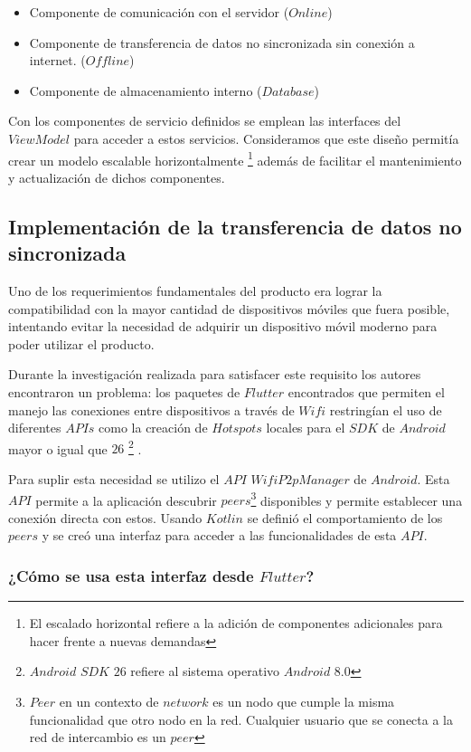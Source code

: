 \begin{itemize}
\item Componente de comunicación con el servidor ($Online$)
\item Componente de transferencia de datos no sincronizada sin conexión a internet. ($Offline$)
\item Componente de almacenamiento interno ($Database$)
\end{itemize}

Con los componentes de servicio definidos se emplean las interfaces del $ViewModel$ para acceder a estos servicios. Consideramos que este diseño permitía crear un modelo escalable horizontalmente \footnote{El escalado horizontal refiere a la adición de componentes adicionales para hacer frente a nuevas demandas} además de facilitar el mantenimiento y actualización de dichos componentes.

\subsection{Implementación de la transferencia de datos no sincronizada}

Uno de los requerimientos fundamentales del producto era lograr la compatibilidad con la mayor cantidad de dispositivos móviles que fuera posible, intentando evitar la necesidad de adquirir un dispositivo móvil moderno para poder utilizar el producto.

Durante la investigación realizada para satisfacer este requisito los autores encontraron un problema: los paquetes de $Flutter$ encontrados que permiten el manejo las conexiones entre dispositivos a través de $Wifi$ restringían el uso de diferentes $APIs$ como la creación de $Hotspots$ locales para el $SDK$ de $Android$ mayor o igual que $26$ \footnote{$Android$ $SDK$ $26$ refiere al sistema operativo $Android$ $8.0$} .

Para suplir esta necesidad se utilizo el $API$ $WifiP2pManager$ de $Android$. Esta $API$ permite a la aplicación descubrir $peers$\footnote{$Peer$ en un contexto de $network$ es un nodo que cumple la misma funcionalidad que otro nodo en la red. Cualquier usuario que se conecta a la red de intercambio es un $peer$} disponibles y permite establecer una conexión directa con estos. Usando $Kotlin$ se definió el comportamiento de los $peers$ y se creó una interfaz para acceder a las funcionalidades de esta $API$.

\subsubsection{¿Cómo se usa esta interfaz desde $Flutter$?}


